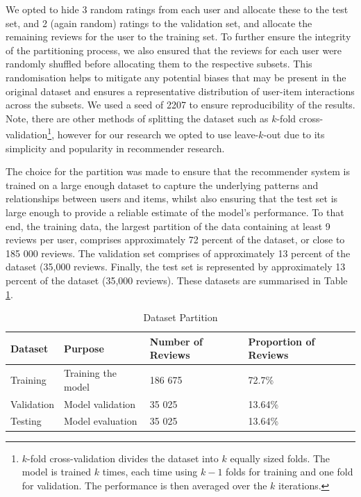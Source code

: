 We opted to hide 3 random ratings from each user and allocate these to the test set, and 2 (again random) ratings to the validation set, and allocate the remaining reviews for the user to the training set. To further ensure the integrity of the partitioning process, we also ensured that the reviews for each user were randomly shuffled before allocating them to the respective subsets. This randomisation helps to mitigate any potential biases that may be present in the original dataset and ensures a representative distribution of user-item interactions across the subsets. We used a seed of 2207 to ensure reproducibility of the results. Note, there are other methods of splitting the dataset such as $k$-fold cross-validation\footnote{$k$-fold cross-validation divides the dataset into $k$ equally sized folds. The model is trained $k$ times, each time using $k-1$ folds for training and one fold for validation. The performance is then averaged over the $k$ iterations.}, however for our research we opted to use leave-$k$-out due to its simplicity and popularity in recommender research.

The choice for the partition was made to ensure that the recommender system is trained on a large enough dataset to capture the underlying patterns and relationships between users and items, whilst also ensuring that the test set is large enough to provide a reliable estimate of the model's performance. To that end, the training data, the largest partition of the data containing at least 9 reviews per user, comprises approximately 72 percent of the dataset, or close to 185 000 reviews. The validation set comprises of approximately 13 percent of the dataset (35,000 reviews. Finally, the test set is represented by approximately 13 percent of the dataset (35,000 reviews). These datasets are summarised in Table \ref{tab:partition summary}.

\begin{table}[h]
  \centering
  \begin{tabular}{|l|l|l|l|}
  \hline
  \textbf{Dataset} & \textbf{Purpose} & \textbf{Number of Reviews} & \textbf{Proportion of Reviews} \\
  \hline
  Training & Training the model  & 186 675 & 72.7\% \\
  \hline
  Validation & Model validation  & 35 025 & 13.64\% \\
  \hline
  Testing & Model evaluation  & 35 025 & 13.64\% \\
  \hline
  \end{tabular}
  \caption{Dataset Partition}
  \label{tab:partition summary}
  \end{table}


